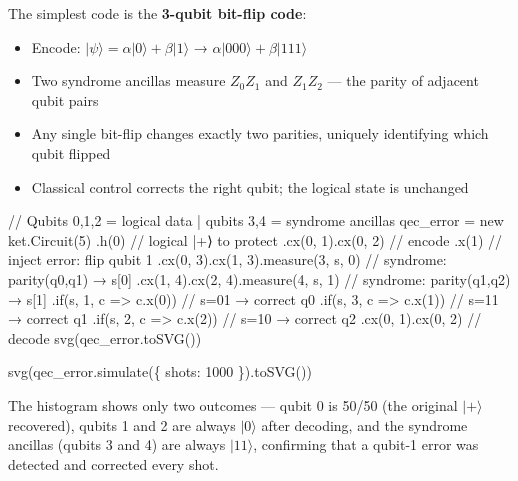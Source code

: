 \documentclass[
  11pt,
  letterpaper,
  oneside]{scrbook}
\newenvironment{Shaded}{\begin{snugshade}}{\end{snugshade}}
\newcommand{\NormalTok}[1]{\textcolor[rgb]{0.00,0.23,0.31}{#1}}
\providecommand{\tightlist}{%
  \setlength{\itemsep}{0pt}\setlength{\parskip}{0pt}}
\begin{document}
The simplest code is the \textbf{3-qubit bit-flip code}:

\begin{itemize}
\tightlist
\item
  Encode: \(|\psi\rangle = \alpha|0\rangle + \beta|1\rangle\) →
  \(\alpha|000\rangle + \beta|111\rangle\)
\item
  Two syndrome ancillas measure \(Z_0Z_1\) and \(Z_1Z_2\) --- the parity
  of adjacent qubit pairs
\item
  Any single bit-flip changes exactly two parities, uniquely identifying
  which qubit flipped
\item
  Classical control corrects the right qubit; the logical state is
  unchanged
\end{itemize}

\begin{Shaded}
\begin{Highlighting}[]
\NormalTok{// Qubits 0,1,2 = logical data  |  qubits 3,4 = syndrome ancillas}
\NormalTok{qec\_error = new ket.Circuit(5)}
\NormalTok{  .h(0)                                      // logical |+⟩ to protect}
\NormalTok{  .cx(0, 1).cx(0, 2)                         // encode}
\NormalTok{  .x(1)                                      // inject error: flip qubit 1}
\NormalTok{  .cx(0, 3).cx(1, 3).measure(3, \textquotesingle{}s\textquotesingle{}, 0)     // syndrome: parity(q0,q1) → s[0]}
\NormalTok{  .cx(1, 4).cx(2, 4).measure(4, \textquotesingle{}s\textquotesingle{}, 1)     // syndrome: parity(q1,q2) → s[1]}
\NormalTok{  .if(\textquotesingle{}s\textquotesingle{}, 1, c =\textgreater{} c.x(0))                  // s=01 → correct q0}
\NormalTok{  .if(\textquotesingle{}s\textquotesingle{}, 3, c =\textgreater{} c.x(1))                  // s=11 → correct q1}
\NormalTok{  .if(\textquotesingle{}s\textquotesingle{}, 2, c =\textgreater{} c.x(2))                  // s=10 → correct q2}
\NormalTok{  .cx(0, 1).cx(0, 2)                        // decode}
\NormalTok{svg(qec\_error.toSVG())}
\end{Highlighting}
\end{Shaded}

\begin{Shaded}
\begin{Highlighting}[]
\NormalTok{svg(qec\_error.simulate(\{ shots: 1000 \}).toSVG())}
\end{Highlighting}
\end{Shaded}

The histogram shows only two outcomes --- qubit 0 is 50/50 (the original
\(|+\rangle\) recovered), qubits 1 and 2 are always \(|0\rangle\) after
decoding, and the syndrome ancillas (qubits 3 and 4) are always
\(|11\rangle\), confirming that a qubit-1 error was detected and
corrected every shot.
\end{document}
